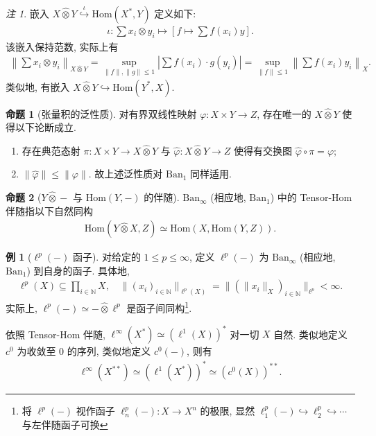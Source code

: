 \documentclass{MainStyle}
\theoremstyle{definition}
\newtheorem{example}{例}
\theoremstyle{definition}
\theoremstyle{definition}
\theoremstyle{definition}
\newtheorem{proposition}{命题}
\theoremstyle{definition}
\theoremstyle{definition}
\theoremstyle{definition}
\theoremstyle{remark}
\newtheorem{remark}{注}
\theoremstyle{remark}
\begin{document}
\begin{remark}
    嵌入 $X\hat \otimes Y\overset \iota \hookrightarrow \mathrm{Hom}(X^\ast, Y)$ 定义如下:
    \begin{align*}
        \iota: \sum x_i\otimes y_i\mapsto \left[f\mapsto \sum f(x_i)y\right].
    \end{align*}
    该嵌入保持范数, 实际上有
    \begin{align*}
        \left\|\sum x_i\otimes y_i\right\|_{X\hat \otimes Y}=\sup_{\|f\|,\|g\|\leq 1}\left|\sum f(x_i) \cdot g(y_i)\right|=\sup_{\|f\|\leq 1}\left\|\sum f(x_i)y_i\right\|_X.
    \end{align*}
    类似地, 有嵌入 $X\hat\otimes Y\hookrightarrow \mathrm{Hom}(Y^\ast, X)$.
\end{remark}

\begin{proposition}[张量积的泛性质]
    对有界双线性映射 $\varphi :X\times Y\to Z$, 存在唯一的 $X\hat \otimes Y$ 使得以下论断成立.
    \begin{enumerate}
        \item 存在典范态射 $\pi:X\times Y\to X\hat\otimes Y$ 与 $\hat \varphi:X\hat\otimes Y\to Z$ 使得有交换图 $\hat\varphi\circ \pi=\varphi$;
        \item $\|\hat \varphi\|\leq \|\varphi\|$. 故上述泛性质对 $\mathrm{Ban}_1$ 同样适用.
    \end{enumerate}
\end{proposition}

\begin{proposition}[$Y\hat\otimes-$ 与 $\mathrm{Hom}(Y,-)$ 的伴随]
    $\mathrm{Ban}_\infty$ (相应地, $\mathrm{Ban}_1$) 中的 Tensor-Hom 伴随指以下自然同构
    \begin{align*}
        \mathrm{Hom}(Y\hat \otimes X,Z)\simeq \mathrm{Hom}(X,\mathrm{Hom}(Y,Z)).
    \end{align*}
\end{proposition}


\begin{example}[$\ell^p(-)$ 函子]
    对给定的 $1\leq p\leq \infty$, 定义 $\ell^p(-)$ 为 $\mathrm{Ban}_\infty$ (相应地, $\mathrm{Ban}_1$) 到自身的函子. 具体地,
    \begin{align*}
        \ell^p(X)\subseteq \prod_{i\in \mathbb N} X, \quad \|(x_i)_{i\in \mathbb N}\|_{\ell^p(X)}=\|(\|x_i\|_{X})_{i\in \mathbb N}\|_{\ell^p}<\infty.
    \end{align*}
    实际上, $\ell^p(-)\simeq -\hat\otimes \ell^p$ 是函子间同构\footnote{将 $\ell^p(-)$ 视作函子 $\ell^p_n(-):X\to X^n$ 的极限, 显然 $\ell^p_1(-)\hookrightarrow \ell^p_2\hookrightarrow \cdots $ 与左伴随函子可换}.\par
    依照 Tensor-Hom 伴随, $\ell^\infty(X^\ast)\simeq (\ell^1(X))^\ast$ 对一切 $X$ 自然. 类似地定义 $c^0$ 为收敛至 $0$ 的序列, 类似地定义 $c^0(-)$, 则有
    \begin{align*}
        \ell^\infty(X^{\ast\ast})\simeq (\ell^1(X^\ast))^\ast\simeq (c^0(X))^{\ast\ast}.
    \end{align*}
\end{example}
\end{document}
